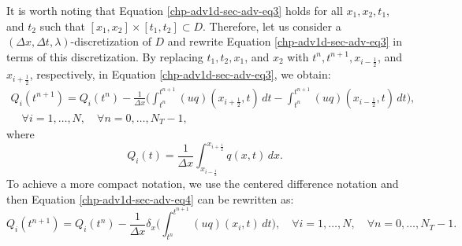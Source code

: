 It is worth noting that Equation \eqref{chp-adv1d-sec-adv-eq3} holds for all $x_1, x_2, t_1$, and $t_2$ such that $[x_1, x_2]
\times [t_1, t_2] \subset D$. Therefore, let us consider a $(\Delta x, \Delta t, \lambda)$-discretization of $D$ and 
rewrite Equation \eqref{chp-adv1d-sec-adv-eq3} in terms of this discretization. By replacing $t_1, t_2, x_1$, and $x_2$ with
$t^{n}, t^{n+1}, x_{i-\frac{1}{2}}$, and $x_{i+\frac{1}{2}}$, respectively, in Equation \eqref{chp-adv1d-sec-adv-eq3}, we obtain:
\begin{equation}
    \label{chp-adv1d-sec-adv-eq4}
	\begin{aligned}
		{Q}_i(t^{n+1}) =  {Q}_i(t^{n}) -
		\frac{1}{\Delta x}\bigg( \int_{t^{n}}^{t^{n+1}}
        	{(uq)}(x_{i+\frac{1}{2}}, t) \,dt -
		\int_{t^{n}}^{t^{n+1}}{(uq)}(x_{i-\frac{1}{2}}, t) \,dt \bigg), \\
		\quad \forall i = 1, \ldots, N,
		\quad \forall n = 0, \ldots, N_T-1,
	\end{aligned}
\end{equation}
where 
\begin{equation}
{Q}_i(t) = \frac{1}{\Delta x}\int_{x_{i-\frac{1}{2}}}^{x_{i+\frac{1}{2}}} {q}(x,t) \,dx.
\end{equation}
To achieve a more compact notation, we use the centered difference notation
and then Equation \eqref{chp-adv1d-sec-adv-eq4} can be rewritten as:
\begin{equation}
    \label{chp-adv1d-sec-adv-eq6}
    {Q}_i(t^{n+1}) =  {Q}_i(t^{n}) -
	\frac{1}{\Delta x} \delta _x\bigg( \int_{t^{n}}^{t^{n+1}}
        {(uq)}(x_{i}, t) \,dt \bigg),
        \quad \forall i = 1, \ldots, N,
        \quad \forall n = 0, \ldots, N_T-1.
\end{equation}

